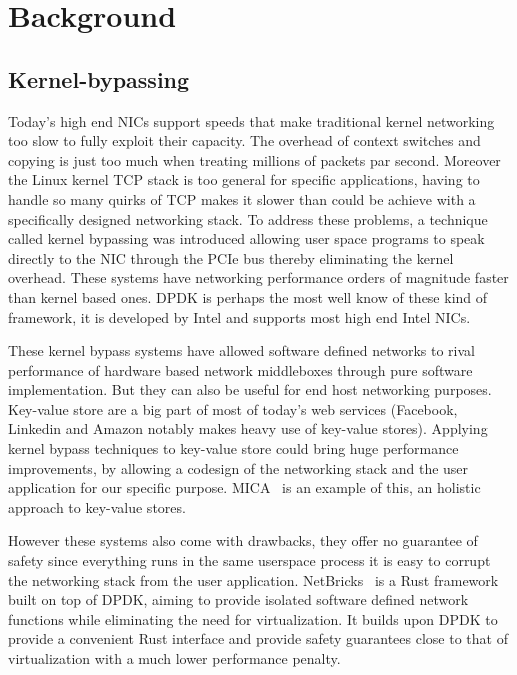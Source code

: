 \chapter{Background}

\section{Kernel-bypassing}

Today's high end NICs support speeds that make traditional kernel
networking too slow to fully exploit their capacity. The overhead of
context switches and copying is just too much when treating millions
of packets par second. Moreover the Linux kernel TCP stack is too
general for specific applications, having to handle so many quirks of
TCP makes it slower than could be achieve with a specifically designed
networking stack. To address these problems, a technique called kernel
bypassing was introduced allowing user space programs to speak
directly to the NIC through the PCIe bus thereby eliminating the
kernel overhead. These systems have networking performance orders of
magnitude faster than kernel based ones. DPDK is perhaps the most well
know of these kind of framework, it is developed by Intel and supports
most high end Intel NICs.

These kernel bypass systems have allowed software defined networks to
rival performance of hardware based network middleboxes through pure
software implementation. But they can also be useful for end host
networking purposes. Key-value store are a big part of most of today's
web services (Facebook, Linkedin and Amazon notably makes heavy use of
key-value stores). Applying kernel bypass techniques to key-value
store could bring huge performance improvements, by allowing a
codesign of the networking stack and the user application for our
specific purpose. MICA~\cite{mica} is an example of this, an holistic
approach to key-value stores.

However these systems also come with drawbacks, they offer no
guarantee of safety since everything runs in the same userspace
process it is easy to corrupt the networking stack from the user
application. NetBricks~\cite{netbricks} is a Rust framework built on
top of DPDK, aiming to provide isolated software defined network
functions while eliminating the need for virtualization. It builds
upon DPDK to provide a convenient Rust interface and provide safety
guarantees close to that of virtualization with a much lower
performance penalty.

